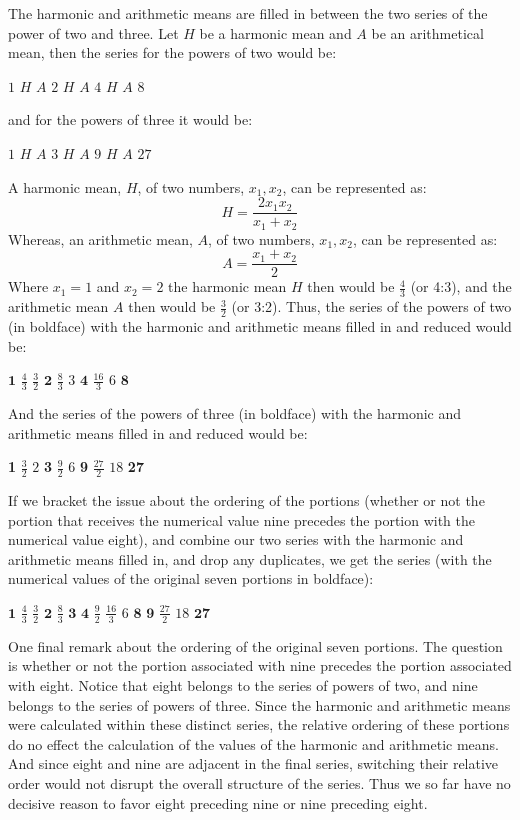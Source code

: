 The harmonic and arithmetic means are filled in between the two series of the power of two and three. Let \( H \) be a harmonic mean and \( A \) be an arithmetical mean, then the series for the powers of two would be:
\begin{center}
	\( 1 \) \( H \) \( A \) \( 2 \) \( H \) \( A \) \( 4 \) \( H \) \( A \) \( 8 \) 
\end{center}
and for the powers of three it would be:
\begin{center}
	\( 1 \) \( H \) \( A \) \( 3 \) \( H \) \( A \) \( 9 \) \( H \) \( A \) \( 27 \)
\end{center}
A harmonic mean, \( H \), of two numbers, \( x_{1}, x_{2} \), can be represented as:
\[ H = \frac{2x_{1}x_{2}}{x_{1} + x_{2}} \]
Whereas, an arithmetic mean, \( A \), of two numbers, \( x_{1}, x_{2} \), can be represented as:
\[ A = \frac{x_{1} + x_{2}}{2} \]
Where \( x_{1} = 1 \) and \( x_{2} = 2 \) the harmonic mean \( H \) then would be \( \frac{4}{3} \) (or 4:3), and the arithmetic mean \( A \) then would be \( \frac{3}{2} \) (or 3:2). Thus, the series of the powers of two (in boldface) with the harmonic and arithmetic means filled in and reduced would be:
\begin{center}
	\( \mathbf{1} \) \( \frac{4}{3} \) \( \frac{3}{2} \) \( \mathbf{2} \) \( \frac{8}{3} \) \( 3 \) \( \mathbf{4} \) \( \frac{16}{3} \) \( 6 \) \( \mathbf{8} \)
\end{center}
And the series of the powers of three (in boldface) with the harmonic and arithmetic means filled in and reduced would be:
\begin{center}
	\textbf{1} \( \frac{3}{2} \) \( 2 \) \textbf{3} \( \frac{9}{2} \) \( 6 \) \textbf{9} \( \frac{27}{2} \) \( 18 \) \textbf{27}
\end{center}
If we bracket the issue about the ordering of the portions (whether or not the portion that receives the numerical value nine precedes the portion with the numerical value eight), and combine our two series with the harmonic and arithmetic means filled in, and drop any duplicates, we get the series (with the numerical values of the original seven portions in boldface):
\begin{center}
	\( \mathbf{1} \) \( \frac{4}{3} \) \( \frac{3}{2} \) \( \mathbf{2} \) \( \frac{8}{3} \) \( \mathbf{3} \) \( \mathbf{4} \) \( \frac{9}{2} \) \( \frac{16}{3} \) \( 6 \) \( \mathbf{8} \) \( \mathbf{9} \) \( \frac{27}{2} \) \( 18 \) \( \mathbf{27} \)
\end{center}

One final remark about the ordering of the original seven portions. The question is whether or not the portion associated with nine precedes the portion associated with eight. Notice that eight belongs to the series of powers of two, and nine belongs to the series of powers of three. Since the harmonic and arithmetic means were calculated within these distinct series, the relative ordering of these portions do no effect the calculation of the values of the harmonic and arithmetic means. And since eight and nine are adjacent in the final series, switching their relative order would not disrupt the overall structure of the series. Thus we so far have no decisive reason to favor eight preceding nine or nine preceding eight.

